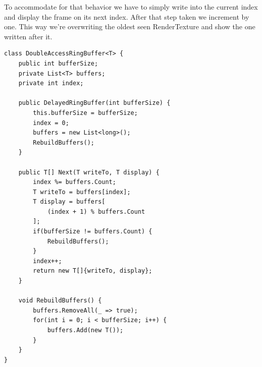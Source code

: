 To accommodate for that behavior we have to simply write into the current index 
and display the frame on its next index. After that step taken we increment by 
one. This way we’re overwriting the oldest seen RenderTexture and show the one 
written after it.

\begin{lstlisting}
class DoubleAccessRingBuffer<T> {
	public int bufferSize;
	private List<T> buffers;
	private int index;
	
	public DelayedRingBuffer(int bufferSize) {
		this.bufferSize = bufferSize;
		index = 0;
		buffers = new List<long>();
		RebuildBuffers();
	}
	
	public T[] Next(T writeTo, T display) {
		index %= buffers.Count;
		T writeTo = buffers[index];
		T display = buffers[
			(index + 1) % buffers.Count
		];
		if(bufferSize != buffers.Count) {
			RebuildBuffers();
		}
		index++;
		return new T[]{writeTo, display};
	}
	
	void RebuildBuffers() {
		buffers.RemoveAll(_ => true);
		for(int i = 0; i < bufferSize; i++) {
			buffers.Add(new T());
		}
	}
}
\end{lstlisting}

